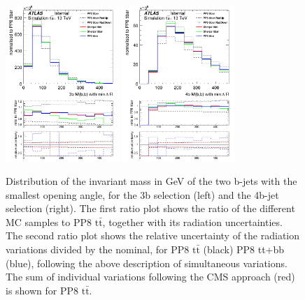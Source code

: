 \begin{figure}[!htb]
\centering
\includegraphics[width=0.38\textwidth]{Plots/ttbb/hisgenEvt_M_MinDeltaRGenBJets_4j3t__div}
\includegraphics[width=0.38\textwidth]{Plots/ttbb/hisgenEvt_M_MinDeltaRGenBJets_4j4t__div}
  \caption{Distribution of the invariant mass in GeV of the two b-jets with the smallest opening angle, for the 3b selection (left) and the 4b-jet selection (right). The first ratio plot shows the ratio of the different MC samples to PP8 $\mathrm{t\bar{t}}$, together with its radiation uncertainties. The second ratio plot shows the relative uncertainty of the radiation variations divided by the nominal, for PP8 $\mathrm{t\bar{t}}$ (black) PP8 tt+bb (blue), following the above description of simultaneous variations. The sum of individual variations following the CMS approach (red) is shown for PP8 $\mathrm{t\bar{t}}$. \label{ttbb:MbbminDR}}
\end{figure}

